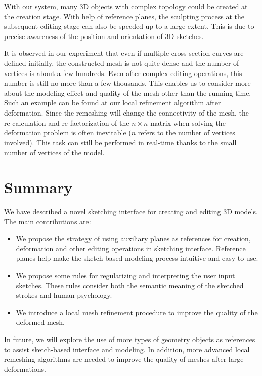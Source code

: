 With our system, many 3D objects with complex topology could be created at the creation stage. With help of reference planes, the sculpting process at the subsequent editing stage can also be speeded up to a large extent. This is due to precise awareness of the position and orientation of 3D sketches.

It is observed in our experiment that even if multiple cross section curves are defined initially, the constructed mesh is not quite dense and the number of vertices is about a few hundreds. Even after complex editing operations, this number is still no more than a few thousands. This enables us to consider more about the modeling effect and quality of the mesh other than the running time. Such an example can be found at our local refinement algorithm after deformation. Since the remeshing will change the connectivity of the mesh, the re-calculation and re-factorization of the $n \times n$ matrix when solving the deformation problem is often inevitable ($n$ refers to the number of vertices involved). This task can still be performed in real-time thanks to the small number of vertices of the model.


\section{Summary}\label{ch3:sec:sum}

We have described a novel sketching interface for creating and editing 3D models. The main contributions are:

\begin{itemize}
	\item We propose the strategy of using auxiliary planes as references for creation, deformation and other editing operations in sketching interface. Reference planes help make the sketch-based modeling process intuitive and easy to use.
	\item We propose some rules for regularizing and interpreting the user input sketches. These rules consider both the semantic meaning of the sketched strokes and human psychology.
	\item We introduce a local mesh refinement procedure to improve the quality of the deformed mesh.
\end{itemize}

In future, we will explore the use of more types of geometry objects as references to assist sketch-based interface and modeling. In addition, more advanced local remeshing algorithms are needed to improve the quality of meshes after large deformations.